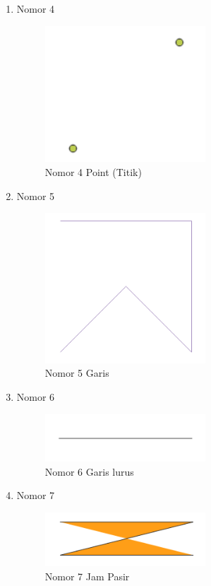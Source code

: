 \begin{enumerate}
	\item Nomor 4
	
	\begin{figure}[H]
		\includegraphics[width=6cm]{figures/Tugas2/1174076/soal4.png}
		\centering
		\caption{Nomor 4 Point (Titik)}
	\end{figure}

	\item Nomor 5
	
	\begin{figure}[H]
		\includegraphics[width=6cm]{figures/Tugas2/1174076/soal5.png}
		\centering
		\caption{Nomor 5 Garis}
	\end{figure}

	\item Nomor 6
	
	\begin{figure}[H]
		\includegraphics[width=6cm]{figures/Tugas2/1174076/soal6.png}
		\centering
		\caption{Nomor 6 Garis lurus}
	\end{figure}

	\item Nomor 7
	
	\begin{figure}[H]
		\includegraphics[width=6cm]{figures/Tugas2/1174076/soal7.png}
		\centering
		\caption{Nomor 7 Jam Pasir}
	\end{figure}


\end{enumerate}
